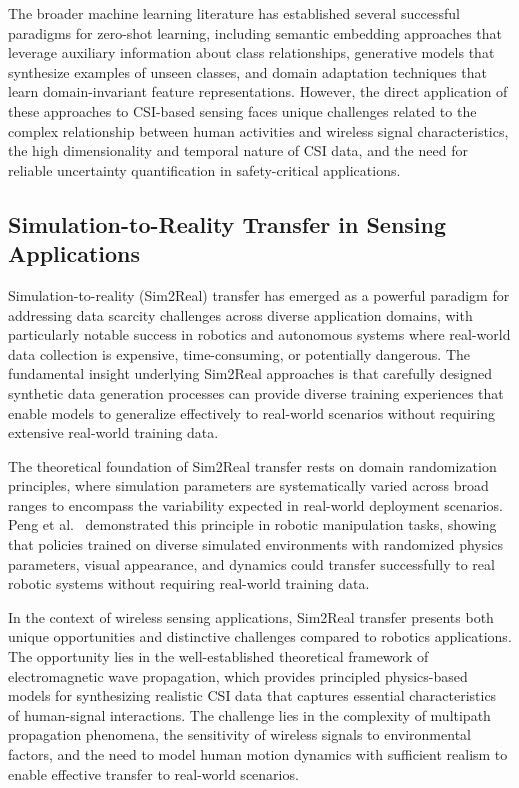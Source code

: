\documentclass[journal]{IEEEtran}
\begin{document}
The broader machine learning literature has established several successful paradigms for zero-shot learning, including semantic embedding approaches that leverage auxiliary information about class relationships, generative models that synthesize examples of unseen classes, and domain adaptation techniques that learn domain-invariant feature representations. However, the direct application of these approaches to CSI-based sensing faces unique challenges related to the complex relationship between human activities and wireless signal characteristics, the high dimensionality and temporal nature of CSI data, and the need for reliable uncertainty quantification in safety-critical applications.

\subsection{Simulation-to-Reality Transfer in Sensing Applications}

Simulation-to-reality (Sim2Real) transfer has emerged as a powerful paradigm for addressing data scarcity challenges across diverse application domains, with particularly notable success in robotics and autonomous systems where real-world data collection is expensive, time-consuming, or potentially dangerous. The fundamental insight underlying Sim2Real approaches is that carefully designed synthetic data generation processes can provide diverse training experiences that enable models to generalize effectively to real-world scenarios without requiring extensive real-world training data.

The theoretical foundation of Sim2Real transfer rests on domain randomization principles, where simulation parameters are systematically varied across broad ranges to encompass the variability expected in real-world deployment scenarios. Peng et al.~\cite{peng2018sim2real} demonstrated this principle in robotic manipulation tasks, showing that policies trained on diverse simulated environments with randomized physics parameters, visual appearance, and dynamics could transfer successfully to real robotic systems without requiring real-world training data.

In the context of wireless sensing applications, Sim2Real transfer presents both unique opportunities and distinctive challenges compared to robotics applications. The opportunity lies in the well-established theoretical framework of electromagnetic wave propagation, which provides principled physics-based models for synthesizing realistic CSI data that captures essential characteristics of human-signal interactions. The challenge lies in the complexity of multipath propagation phenomena, the sensitivity of wireless signals to environmental factors, and the need to model human motion dynamics with sufficient realism to enable effective transfer to real-world scenarios.
\end{document}

